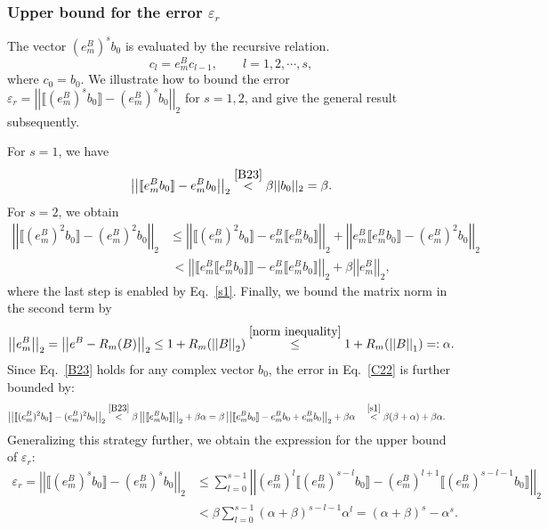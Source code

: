 \documentclass[letterpaper,10pt]{iopart}
\newcommand{\norm}[1]{\left|\left|#1\right|\right|}
\newcommand{\todo}[1]{{\color{red}{ (TODO: #1) }}}
\begin{document}
\subsubsection{Upper bound for the error $\varepsilon_r$}
\label{Upper bound of }
The vector $(e^B_m)^sb_0 $ is evaluated by the recursive relation.
\begin{equation}
\label{recursive relation2}
    c_l=e^B_m c_{l-1},\qquad l=1,2,\cdots,s,
\end{equation}
where $c_0=b_0$. 
We illustrate how to bound the error $\varepsilon_r=\norm{\llbracket (e^B_m)^sb_0\rrbracket-(e^B_m)^sb_0 }_2$ for $s=1,2$, and give the general result subsequently. 

For $s=1$, we have 
\begin{equation}
\label{s1}
    \norm{\llbracket e^B_mb_0\rrbracket-e^B_mb_0 }_2\overset{\eqref{B23}}{<}\beta||b_0||_2=\beta.
\end{equation}
For $s=2$, we obtain
\begin{align}
\label{C22}
\nonumber    \norm{\llbracket (e^B_m)^2b_0\rrbracket-(e^B_m)^2b_0 }_2 &\leq\norm{\llbracket (e^B_m)^2b_0\rrbracket-     
    e^B_m\llbracket e^B_mb_0\rrbracket}_2+\norm{e^B_m\llbracket e^B_mb_0\rrbracket-(e^B_m)^2b_0}_2\\
   &\, <\norm{\llbracket e^B_m \llbracket e^B_mb_0\rrbracket\rrbracket-     
    e^B_m\llbracket e^B_mb_0\rrbracket}_2+\beta\norm{e^B_m}_2,
\end{align} 
where the last step is enabled by Eq.\ \eqref{s1}.
Finally, we bound the matrix norm in the second term by
\begin{equation}
    \norm{e^B_m}_2=\norm{e^B-R_m(B)}_2\leq 1+R_m(\norm{B}_2)\overset{\eqref{norm inequality}}{\leq} 1+R_m(\norm{B}_1)=:\alpha.
\end{equation}
Since Eq.\ \eqref{B23} holds for any complex vector $b_0$, the error in Eq.\ \eqref{C22} is further bounded by:
\begin{align}
    \norm{\llbracket (e^B_m)^2b_0\rrbracket-(e^B_m)^2b_0 }_2\overset{\eqref{B23}}{<}\beta\norm{\llbracket e^B_mb_0\rrbracket}_2+\beta\alpha &=\beta\norm{\llbracket e^B_mb_0\rrbracket-e^B_mb_0+e^B_mb_0}_2+\beta\alpha\quad \overset{\eqref{s1}}{<}\beta(\beta+\alpha)+\beta\alpha.
\end{align}
Generalizing this strategy further, we obtain the expression for the upper bound of $\varepsilon_r$: 
\begin{align}
\label{rouding}
\nonumber    \varepsilon_r=\norm{\llbracket (e^B_m)^sb_0\rrbracket-(e^B_m)^sb_0 }_2 &\leq \sum_{l=0}^{s-1}\norm{(e^B_m)^l \llbracket (e^B_m)^{s-l}b_0\rrbracket-(e^B_m)^{l+1}\llbracket (e^B_m)^{s-l-1}b_0\rrbracket}_2\\
    &<\beta\sum_{l=0}^{s-1}(\alpha+\beta)^{s-l-1}\alpha^{l}=(\alpha+\beta)^s-\alpha^s.
\end{align}    
\end{document}
